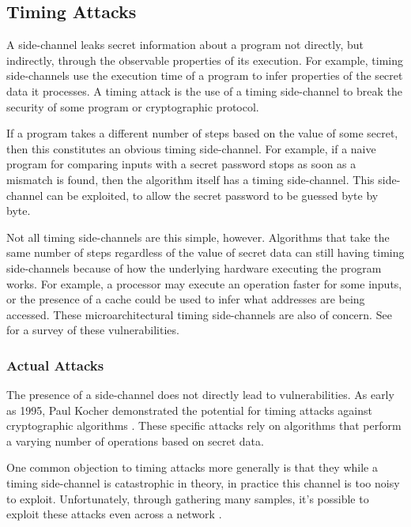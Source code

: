 \documentclass[11pt, a4paper]{article} %
\begin{document}
{\subsection{Timing Attacks}

A side-channel
\cite{kelsey_side_1998}
leaks secret information about a program not directly,
but indirectly, through the observable properties of its execution.
For example, timing side-channels use the execution time of a program
to infer properties of the secret data it processes. 
A timing attack is the use of a timing side-channel to break the security
of some program or cryptographic protocol.

If a program takes a different number of steps based on the value of some
secret, then this constitutes an obvious timing side-channel.
For example, if a naive program for comparing inputs with a secret password
stops as soon as a mismatch is found, then the algorithm itself has
a timing side-channel. This side-channel can be exploited, to allow
the secret password to be guessed byte by byte.

Not all timing side-channels are this simple, however. Algorithms
that take the same number of steps regardless of the value of secret
data can still having timing side-channels because of how the underlying
hardware executing the program works. For example, a processor may
execute an operation faster for some inputs, or the presence of a cache
could be used to infer what addresses are being accessed. These
microarchitectural timing side-channels are also of concern.
See \cite{ge_survey_2018} for a survey of these vulnerabilities.

\subsubsection{Actual Attacks}

The presence of a side-channel does not directly lead to vulnerabilities.
As early as 1995, Paul Kocher
demonstrated the potential for timing attacks against cryptographic
algorithms \cite{kocher_cryptanalysis_1995, kocher_timing_1996}.
These specific attacks rely on algorithms that perform a varying number of
operations based on secret data. 

One common objection to timing attacks more generally is that they
while a timing side-channel is catastrophic in theory, in practice
this channel is too noisy to exploit. Unfortunately, through gathering
many samples, it's possible to exploit these attacks even across
a network \cite{brumley_remote_2005, brumley_remote_2011}.

}
\end{document}

